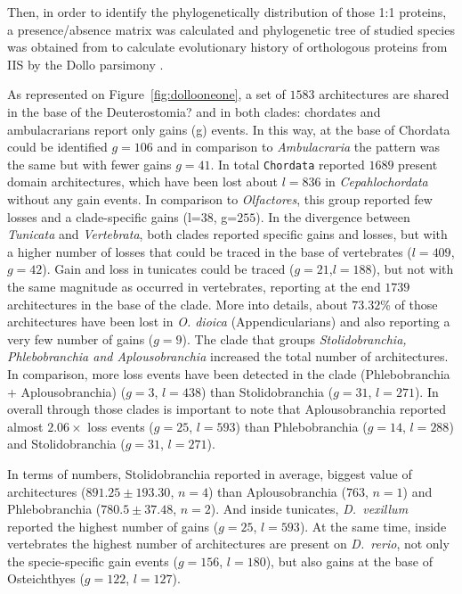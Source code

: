 \documentclass[11pt]{article}
\newcommand{\TODO}[1]{\begingroup\color{red}#1\endgroup}
\begin{document}

Then, in order to identify the phylogenetically distribution of those 1:1 
proteins, a presence/absence matrix was calculated and phylogenetic tree 
of studied species was obtained from \cite{} to calculate evolutionary history 
of orthologous proteins from IIS by the Dollo parsimony \cite{}.

As represented on Figure~\ref{fig:dollooneone}, a set of $1583$ architectures 
are shared in the base of the \TODO{Deuterostomia?} and in both clades: 
chordates and ambulacrarians report only gains (g) events. In this way, at the 
base of Chordata could be identified $g=106$ and in comparison to \textit{Ambulacraria}
the pattern was the same but with fewer gains $g=41$. In total \texttt{Chordata}
reported $1689$ present domain architectures, which have been lost about
$l=836$ in \textit{Cepahlochordata} without any gain events. In comparison
to \textit{Olfactores}, this group reported few losses and a clade-specific gains 
(l=$38$, g=$255$). In the divergence between \textit{Tunicata} and 
\textit{Vertebrata}, both clades reported specific gains and losses, but with a 
higher number of losses that could be traced in the base of vertebrates 
($l=409$, $g=42$). Gain and loss in tunicates could be traced ($g=21$,$l=188$), but not with
the same magnitude as occurred in vertebrates, reporting at the end $1739$ architectures in
the base of the clade. More into details, about $73.32$\% of those architectures 
have been lost in \textit{O. dioica} (Appendicularians) and also reporting a very 
few number of gains ($g=9$). \TODO{The clade that groups} \textsl{Stolidobranchia, 
Phlebobranchia and Aplousobranchia} increased the total number of architectures. 
In comparison, more loss events have been detected in the clade (Phlebobranchia +
Aplousobranchia) ($g=3$, $l=438$) than Stolidobranchia ($g=31$, $l=271$). In 
overall through those clades is important to note that Aplousobranchia reported 
almost $2.06\times$ loss events ($g=25$, $l=593$) than Phlebobranchia ($g=14$,
$l=288$) and Stolidobranchia ($g=31$, $l=271$).

In terms of numbers, Stolidobranchia reported in average, biggest value of 
architectures ($891.25 \pm 193.30$, $n=4$) than Aplousobranchia 
($763$, $n=1$) and Phlebobranchia ($780.5 \pm 37.48$, $n=2$).
And inside tunicates, \textit{D.\ vexillum} reported the highest number of
gains ($g=25$, $l=593$). At the same time, inside vertebrates the 
highest number of architectures are present on \textit{D.\ rerio}, 
not only the specie-specific gain events ($g=156$, $l=180$), but also 
gains at the base of Osteichthyes ($g=122$, $l=127$). 
\end{document}
